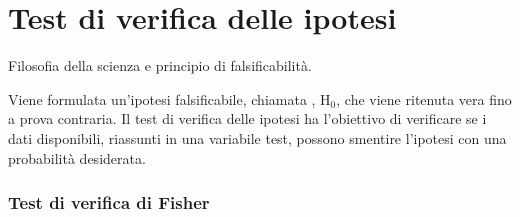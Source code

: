 \documentclass[letterpaper,10pt,italian]{jupyterBook}
\begin{document}
\sphinxstepscope


\section{Test di verifica delle ipotesi}
\label{\detokenize{ch/statistics/hp-test:test-di-verifica-delle-ipotesi}}\label{\detokenize{ch/statistics/hp-test:statistics-hs-inference-hp-test}}\label{\detokenize{ch/statistics/hp-test::doc}}
\sphinxAtStartPar
{} Filosofia della scienza e principio di falsificabilità.

\sphinxAtStartPar
{} Viene formulata un’ipotesi falsificabile, chiamata , \(\text{H}_{0}\), che viene ritenuta vera fino a prova contraria. Il test di verifica delle ipotesi ha l’obiettivo di verificare se i dati disponibili, riassunti in una variabile test, possono smentire l’ipotesi con una probabilità desiderata.
\subsubsection*{Test di verifica di Fisher}
\end{document}
